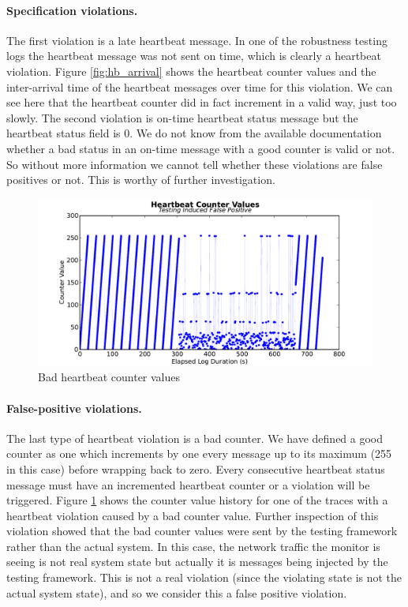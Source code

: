 \paragraph{Specification violations.}
The first violation is a late heartbeat message. In one of the robustness testing logs the heartbeat message was not sent on time, which is clearly a heartbeat violation. Figure \ref{fig:hb_arrival} shows the heartbeat counter values and the inter-arrival time of the heartbeat messages over time for this violation. We can see here that the heartbeat counter did in fact increment in a valid way, just too slowly. 
The second violation is on-time heartbeat status message but the heartbeat status field is 0. 
We do not know from the available documentation whether a bad status in an on-time message with a good counter is valid or not. So without more information we cannot tell whether these violations are false positives or not. This is worthy of further investigation.


\begin{figure}[t]
\centering 
\includegraphics[width=4.5in]{img/hb2}
\caption{Bad heartbeat counter values \label{fig:hb_badcounter}}
\end{figure}

\paragraph{False-positive violations.}
The last type of heartbeat violation is a bad counter. 
We have defined a good counter as one which increments by one every message up to its maximum (255 in this case) before wrapping back to zero.
Every consecutive heartbeat status message must have an incremented heartbeat counter or a violation will be triggered. Figure \ref{fig:hb_badcounter} shows the counter value history for one of the traces with a heartbeat violation caused by a bad counter value.
%
Further inspection of this violation showed that the bad counter values were sent by the testing framework rather than the actual system. In this case, the network traffic the monitor is seeing is not real system state but actually it is messages being injected by the testing framework. This is not a real violation (since the violating state is not the actual system state), and so we consider this a false positive violation.



